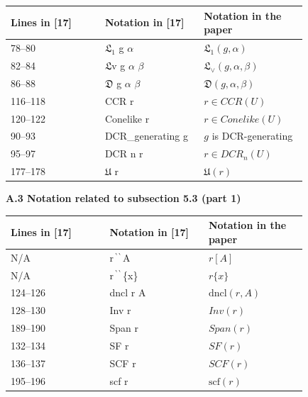 \begin{longtable}{|p{0.27666666666666667\linewidth}|p{0.27666666666666667\linewidth}|p{0.27666666666666667\linewidth}|}\hline
Lines in [17] & Notation in [17] & Notation in the paper \\ \hline
78–80 & $\mathfrak{L}_{1}$ g $\alpha$ & $\mathfrak{L}_{1}(g,\alpha)$ \\ \hline
82–84 & $\mathfrak{L}$v g $\alpha$ $\beta$ & $\mathfrak{L}_{\vee}(g,\alpha,\beta)$ \\ \hline
86–88 & $\mathfrak{D}$ g $\alpha$ $\beta$ & $\mathfrak{D}(g,\alpha,\beta)$ \\ \hline
116–118 & CCR r & $r\in CCR(U)$ \\ \hline
120–122 & Conelike r & $r\in Conelike(U)$ \\ \hline
90–93 & DCR\_generating g & $g$ is DCR-generating \\ \hline
95–97 & DCR n r & $r\in DCR_{n}(U)$ \\ \hline
177–178 & $\mathfrak{U}$ r & $\mathfrak{U}(r)$ \\ \hline
\end{longtable}
 
 
 
 
\par\medskip\noindent\textbf{A.3 Notation related to subsection 5.3 (part 1)}\par
 
 
\begin{longtable}{|p{0.27666666666666667\linewidth}|p{0.27666666666666667\linewidth}|p{0.27666666666666667\linewidth}|}\hline
Lines in [17] & Notation in [17] & Notation in the paper \\ \hline
N/A & r$\,{}^{\backprime\,\backprime}\,$A & $r\left[A\right]$ \\ \hline
N/A & r$\,{}^{\backprime\,\backprime}\,$\{x\} & $r\{x\}$ \\ \hline
124–126 & dncl r A & $\mathrm{dncl}(r,A)$ \\ \hline
128–130 & Inv r & $Inv(r)$ \\ \hline
189–190 & Span r & $Span(r)$ \\ \hline
132–134 & SF r & $SF(r)$ \\ \hline
136–137 & SCF r & $SCF(r)$ \\ \hline
195–196 & scf r & $\mathrm{scf}(r)$ \\ \hline
\end{longtable}
 
